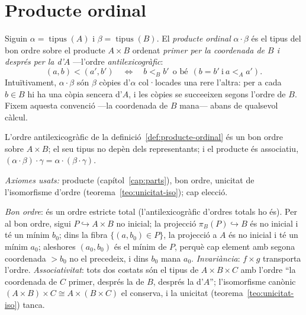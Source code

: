 \section{Producte ordinal}\label{sec:producte-ordinal}

\begin{definicio}\label{def:producte-ordinal}
Siguin \(\alpha=\operatorname{tipus}(A)\) i \(\beta=\operatorname{tipus}(B)\).
El \emph{producte ordinal} \(\alpha\cdot\beta\) és el tipus del bon ordre
sobre el producte \(A\times B\) ordenat \emph{primer per la coordenada de
\(B\) i després per la d'\(A\)} ---l'ordre \emph{antilexicogràfic}:
\[
(a,b)<(a',b')
\quad\Longleftrightarrow\quad
b<_B b'\ \ \text{o bé}\ \ (b=b'\ \text{i}\ a<_A a').
\]
Intuïtivament, \(\alpha\cdot\beta\) són \(\beta\) còpies d'\(\alpha\)
col·locades una rere l'altra: per a cada \(b\in B\) hi ha una còpia sencera
d'\(A\), i les còpies se succeeixen segons l'ordre de \(B\). Fixem aquesta
convenció ---la coordenada de \(B\) mana--- abans de qualsevol càlcul.
\end{definicio}

\begin{proposicio}\label{prop:producte-bon-ordre}
L'ordre antilexicogràfic de la definició~\ref{def:producte-ordinal} és un bon
ordre sobre \(A\times B\); el seu tipus no depèn dels representants; i el
producte és associatiu, \((\alpha\cdot\beta)\cdot\gamma=\alpha\cdot(\beta\cdot\gamma)\).\par
\emph{Axiomes usats:} producte (capítol~\ref{cap:parts}), bon ordre, unicitat
de l'isomorfisme d'ordre (teorema~\ref{teo:unicitat-iso}); cap elecció.
\end{proposicio}

\begin{prova}
\emph{Bon ordre}: és un ordre estricte total (l'antilexicogràfic d'ordres
totals ho és). Per al bon ordre, sigui \(P\hookrightarrow A\times B\) no
inicial; la projecció \(\pi_B(P)\hookrightarrow B\) és no inicial i té un mínim
\(b_0\); dins la fibra \(\{(a,b_0)\in P\}\), la projecció a \(A\) és no
inicial i té un mínim \(a_0\); aleshores \((a_0,b_0)\) és el mínim de \(P\),
perquè cap element amb segona coordenada \(>b_0\) no el precedeix, i dins
\(b_0\) mana \(a_0\). \emph{Invariància}: \(f\times g\) transporta l'ordre.
\emph{Associativitat}: tots dos costats són el tipus de \(A\times B\times C\)
amb l'ordre \enquote{la coordenada de \(C\) primer, després la de \(B\),
després la d'\(A\)}; l'isomorfisme canònic \((A\times B)\times C\cong A\times(B\times C)\)
el conserva, i la unicitat (teorema~\ref{teo:unicitat-iso}) tanca.
\end{prova}

